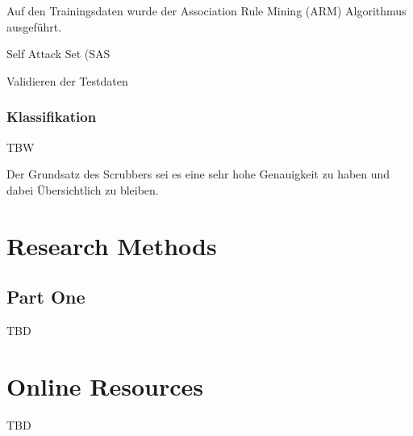\documentclass[sigplan,screen]{acmart}
\begin{document}
Auf den Trainingsdaten wurde der Association Rule Mining (ARM) Algorithmus ausgeführt. 

Self Attack Set (SAS

Validieren der Testdaten


\subsubsection{Klassifikation}

TBW







Der Grundsatz des Scrubbers sei es eine sehr hohe Genauigkeit zu haben und dabei Übersichtlich zu bleiben.
\cite{Hohlfeld01}



\appendix

\section{Research Methods}

\subsection{Part One}

TBD


\section{Online Resources}

TBD
\end{document}
